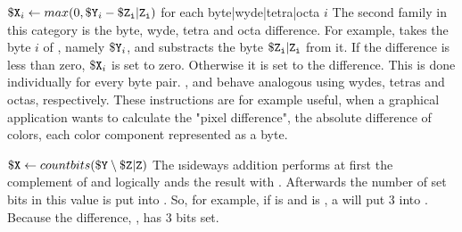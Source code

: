 \instrtbl
	{}
	{${\tt \$X}_i \leftarrow max(0,{\tt \$Y}_i - {\tt \$Z_i}{\tt|Z_i})$ for each byte|wyde|tetra|octa $i$}
\noindent The second family in this category is the byte, wyde, tetra and octa difference. For example,  takes the byte $i$ of , namely ${\tt \$Y}_i$, and substracts the byte ${\tt \$Z_i}{\tt|Z_i}$ from it. If the difference is less than zero, ${\tt \$X}_i$ is set to zero. Otherwise it is set to the difference. This is done individually for every byte pair. ,  and  behave analogous using wydes, tetras and octas, respectively. These instructions are for example useful, when a graphical application wants to calculate the "pixel difference", \ie the absolute difference of colors, each color component represented as a byte. \citep[pg. 8]{mmix-doc}

\instrtbl
	{}
	{${\tt \$X} \leftarrow countbits({\tt \$Y} \setminus {\tt \$Z}{\tt|Z})$}
\noindent The \i{sideways addition}  performs at first the complement of  and logically ands the result with . Afterwards the number of set bits in this value is put into . \citep[pg. 9]{mmix-doc} So, for example, if  is  and  is , a  will put 3 into . Because the difference, , has 3 bits set.

